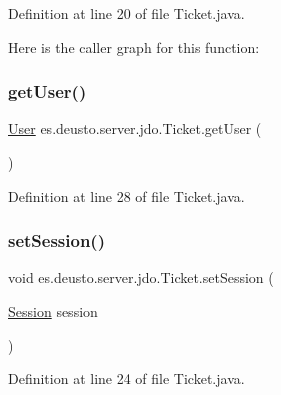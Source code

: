 Definition at line 20 of file Ticket.\+java.

Here is the caller graph for this function\+:
\mbox{\label{classes_1_1deusto_1_1server_1_1jdo_1_1_ticket_a6c4819e9c6938564059c7957bf6a01d1}} 
\subsubsection{\texorpdfstring{getUser()}{getUser()}}
{\footnotesize\ttfamily \mbox{\hyperlink{classes_1_1deusto_1_1server_1_1jdo_1_1_user}{User}} es.\+deusto.\+server.\+jdo.\+Ticket.\+get\+User (\begin{DoxyParamCaption}{ }\end{DoxyParamCaption})}



Definition at line 28 of file Ticket.\+java.

\mbox{\label{classes_1_1deusto_1_1server_1_1jdo_1_1_ticket_a175ab896194b8a3734e335ff63440151}} 
\subsubsection{\texorpdfstring{setSession()}{setSession()}}
{\footnotesize\ttfamily void es.\+deusto.\+server.\+jdo.\+Ticket.\+set\+Session (\begin{DoxyParamCaption}\item[{\mbox{\hyperlink{classes_1_1deusto_1_1server_1_1jdo_1_1_session}{Session}}}]{session }\end{DoxyParamCaption})}



Definition at line 24 of file Ticket.\+java.

\mbox{\label{classes_1_1deusto_1_1server_1_1jdo_1_1_ticket_a072a5e49ddc7060bd6cb521e90d15908}} 

